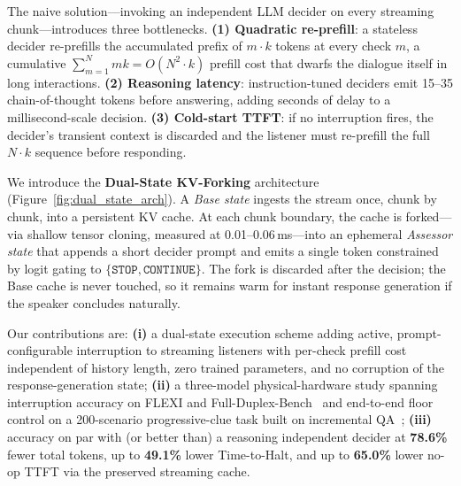 \documentclass{article}
\begin{document}
The naive solution---invoking an independent LLM decider on every streaming chunk---introduces three bottlenecks. \textbf{(1) Quadratic re-prefill}: a stateless decider re-prefills the accumulated prefix of $m \cdot k$ tokens at every check $m$, a cumulative $\sum_{m=1}^{N} m k = O(N^2 \cdot k)$ prefill cost that dwarfs the dialogue itself in long interactions. \textbf{(2) Reasoning latency}: instruction-tuned deciders emit 15--35 chain-of-thought tokens before answering, adding seconds of delay to a millisecond-scale decision. \textbf{(3) Cold-start TTFT}: if no interruption fires, the decider's transient context is discarded and the listener must re-prefill the full $N \cdot k$ sequence before responding.

We introduce the \textbf{Dual-State KV-Forking} architecture (Figure~\ref{fig:dual_state_arch}). A \emph{Base state} ingests the stream once, chunk by chunk, into a persistent KV cache. At each chunk boundary, the cache is forked---via shallow tensor cloning, measured at 0.01--0.06\,ms---into an ephemeral \emph{Assessor state} that appends a short decider prompt and emits a single token constrained by logit gating to $\{\texttt{STOP}, \texttt{CONTINUE}\}$. The fork is discarded after the decision; the Base cache is never touched, so it remains warm for instant response generation if the speaker concludes naturally.

Our contributions are: \textbf{(i)} a dual-state execution scheme adding active, prompt-configurable interruption to streaming listeners with per-check prefill cost independent of history length, zero trained parameters, and no corruption of the response-generation state; \textbf{(ii)} a three-model physical-hardware study spanning interruption accuracy on FLEXI and Full-Duplex-Bench~\citep{lin2025fdbench} and end-to-end floor control on a 200-scenario progressive-clue task built on incremental QA~\citep{rodriguez2021quizbowl, wallace2019trick}; \textbf{(iii)} accuracy on par with (or better than) a reasoning independent decider at \textbf{78.6\%} fewer total tokens, up to \textbf{49.1\%} lower Time-to-Halt, and up to \textbf{65.0\%} lower no-op TTFT via the preserved streaming cache.
\end{document}

